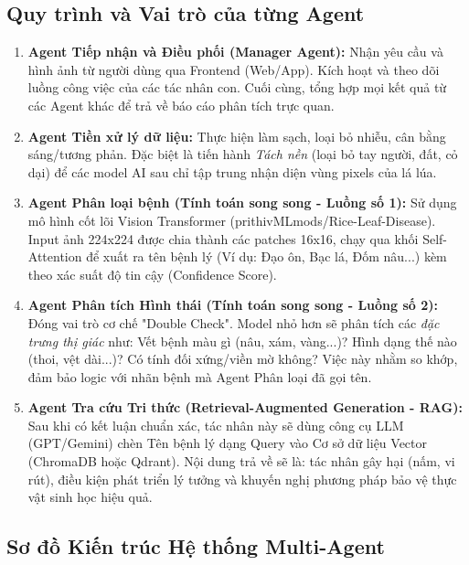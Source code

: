 \documentclass[12pt,a4paper]{article}
\begin{document}
\subsection{Quy trình và Vai trò của từng Agent}

\begin{enumerate}[label=\textbf{B\arabic*:}]
    \item \textbf{Agent Tiếp nhận và Điều phối (Manager Agent):}
    Nhận yêu cầu và hình ảnh từ người dùng qua Frontend (Web/App). Kích hoạt và theo dõi luồng công việc của các tác nhân con. Cuối cùng, tổng hợp mọi kết quả từ các Agent khác để trả về báo cáo phân tích trực quan.
    
    \item \textbf{Agent Tiền xử lý dữ liệu:}
    Thực hiện làm sạch, loại bỏ nhiễu, cân bằng sáng/tương phản. Đặc biệt là tiến hành \textit{Tách nền} (loại bỏ tay người, đất, cỏ dại) để các model AI sau chỉ tập trung nhận diện vùng pixels của lá lúa.
    
    \item \textbf{Agent Phân loại bệnh (Tính toán song song - Luồng số 1):}
    Sử dụng mô hình cốt lõi Vision Transformer (prithivMLmods/Rice-Leaf-Disease). Input ảnh 224x224 được chia thành các patches 16x16, chạy qua khối Self-Attention để xuất ra tên bệnh lý (Ví dụ: Đạo ôn, Bạc lá, Đốm nâu...) kèm theo xác suất độ tin cậy (Confidence Score).
    
    \item \textbf{Agent Phân tích Hình thái (Tính toán song song - Luồng số 2):}
    Đóng vai trò cơ chế "Double Check". Model nhỏ hơn sẽ phân tích các \textit{đặc trưng thị giác} như: Vết bệnh màu gì (nâu, xám, vàng...)? Hình dạng thế nào (thoi, vệt dài...)? Có tính đối xứng/viền mờ không? Việc này nhằm so khớp, đảm bảo logic với nhãn bệnh mà Agent Phân loại đã gọi tên.
    
    \item \textbf{Agent Tra cứu Tri thức (Retrieval-Augmented Generation - RAG):}
    Sau khi có kết luận chuẩn xác, tác nhân này sẽ dùng công cụ LLM (GPT/Gemini) chèn Tên bệnh lý dạng Query vào Cơ sở dữ liệu Vector (ChromaDB hoặc Qdrant). Nội dung trả về sẽ là: tác nhân gây hại (nấm, vi rút), điều kiện phát triển lý tưởng và khuyến nghị phương pháp bảo vệ thực vật sinh học hiệu quả.
\end{enumerate}

\subsection{Sơ đồ Kiến trúc Hệ thống Multi-Agent}
\end{document}

